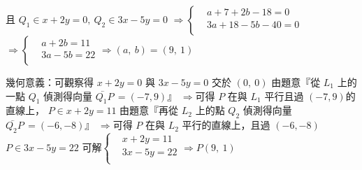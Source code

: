 \begin{QUESTIONS}
\begin{QUESTION}
\begin{QSOLLIST}
\begin{QSOL}[SOLID=16]
				且 ${{Q}_{1}}\in x+2y=0,\ {{Q}_{2}}\in 3x-5y=0$
				$\Rightarrow \left\{ \begin{aligned}
				  & a+7+2b-18=0 \\ 
				 & 3a+18-5b-40=0 \\ 
				\end{aligned} \right.$$\Rightarrow \left\{ \begin{aligned}
				  & a+2b=11 \\ 
				 & 3a-5b=22 \\ 
				\end{aligned} \right.\Rightarrow \left( a,\ b \right)=\left( 9,\ 1 \right)$

			\end{QSOL}
\begin{QSOL}[SOLID=17]
				 幾何意義：可觀察得 $x+2y=0$ 與 $3x-5y=0$ 交於 $\left( 0,\ 0 \right)$
				  由題意『從 ${{L}_{1}}$ 上的一點 ${{Q}_{1}}$ 偵測得向量 $\lvec{{Q}_{1}P}\,=\left( -7,9 \right)$』
				  $\Rightarrow $可得 $P$ 在與 ${{L}_{1}}$ 平行且過 $\left( -7,9 \right)$的直線上， $P\in x+2y=11$
				  由題意『再從 ${{L}_{2}}$ 上的點 ${{Q}_{2}}$ 偵測得向量 $\lvec{{Q}_{2}P}\,=\left( -6,-8 \right)$』
				  $\Rightarrow $可得 $P$ 在與 ${{L}_{2}}$ 平行的直線上，且過 $\left( -6,-8 \right)$ $P\in 3x-5y=22$
				  可解$\left\{ \begin{aligned}
				  & x+2y=11 \\ 
				 & 3x-5y=22 \\ 
				\end{aligned} \right.\Rightarrow P\left( 9,\ 1 \right)$
			\end{QSOL}


\end{QSOLLIST}
\end{QUESTION}
\end{QUESTIONS}
